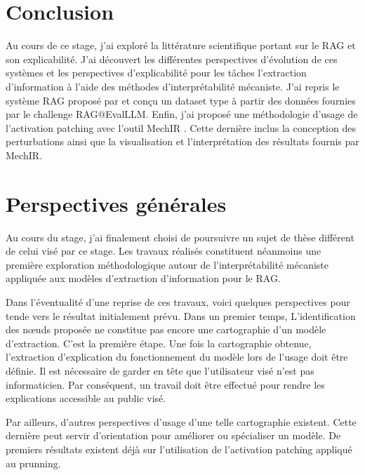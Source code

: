 \section{Conclusion}

    Au cours de ce stage, j'ai exploré la littérature scientifique portant sur le RAG et son explicabilité. J'ai découvert les différentes perspectives d'évolution de ces systèmes et les perspectives d'explicabilité pour les tâches l'extraction d'information à l'aide des méthodes d'interprétabilité mécaniste. J'ai repris le système RAG proposé par \cite{tran_retrieval_2024} et conçu un dataset type à partir des données fournies par le challenge RAG@EvalLLM. Enfin, j'ai proposé une méthodologie d'usage de l'activation patching avec l'outil MechIR \cite{parry_mechir_2025}. Cette dernière inclus la conception des perturbations ainsi que la visualisation et l'interprétation des résultats fournis par MechIR.

\section{Perspectives générales}

    Au cours du stage, j'ai finalement choisi de poursuivre un sujet de thèse différent de celui visé par ce stage. Les travaux réalisés  constituent néanmoins une première exploration méthodologique autour de l'interprétabilité mécaniste appliquée aux modèles d'extraction d'information pour le RAG.

    Dans l'éventualité d'une reprise de ces travaux, voici quelques perspectives pour tende vers le résultat initialement prévu. Dans un premier temps, L'identification des nœuds proposée ne constitue pas encore une cartographie d'un modèle d'extraction. C'est la première étape. Une fois la cartographie obtenue, l'extraction d'explication du fonctionnement du modèle lors de l'usage doit être définie. Il est nécessaire de garder en tête que l'utilisateur visé n'est pas informaticien. Par conséquent, un travail doit être effectué pour rendre les explications accessible au public visé.

    Par ailleurs, d'autres perspectives d'usage d'une telle cartographie existent. Cette dernière peut servir d'orientation pour améliorer ou spécialiser un modèle. De premiers résultats existent déjà sur l'utilisation de l'activation patching appliqué au prunning.